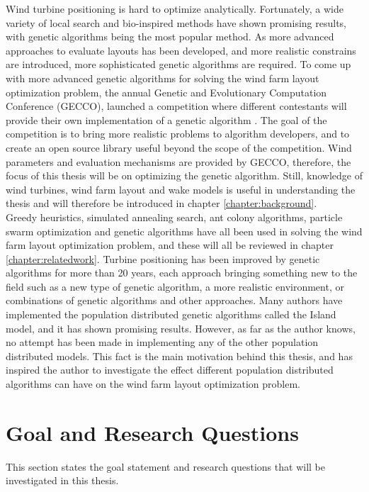 \noindent Wind turbine positioning is hard to optimize analytically. Fortunately, a wide variety of local search and bio-inspired methods have shown promising results, with genetic algorithms being the most popular method. As more advanced approaches to evaluate layouts has been developed, and more realistic constrains are introduced, more sophisticated genetic algorithms are required. To come up with more advanced genetic algorithms for solving the wind farm layout optimization problem, the annual Genetic and Evolutionary Computation Conference (GECCO), launched a competition where different contestants will provide their own implementation of a genetic algorithm \citep{url2}. The goal of the competition is to bring more realistic problems to algorithm developers, and to create an open source library useful beyond the scope of the competition. Wind parameters and evaluation mechanisms are provided by GECCO, therefore, the focus of this thesis will be on optimizing the genetic algorithm. Still, knowledge of wind turbines, wind farm layout and wake models is useful in understanding the thesis and will therefore be introduced in chapter \ref{chapter:background}. \\

\noindent Greedy heuristics, simulated annealing search, ant colony algorithms, particle swarm optimization and genetic algorithms have all been used in solving the wind farm layout optimization problem, and these will all be reviewed in chapter \ref{chapter:relatedwork}. Turbine positioning has been improved by genetic algorithms for more than 20 years, each approach bringing something new to the field such as a new type of genetic algorithm, a more realistic environment, or combinations of genetic algorithms and other approaches. Many authors have implemented the population distributed genetic algorithms called the Island model, and it has shown promising results. However, as far as the author knows, no attempt has been made in implementing any of the other population distributed models. This fact is the main motivation behind this thesis, and has inspired the author to investigate the effect different population distributed algorithms can have on the wind farm layout optimization problem. 


\section{Goal and Research Questions}\label{section:goal&researchquestions}
This section states the goal statement and research questions that will be investigated in this thesis. \\

